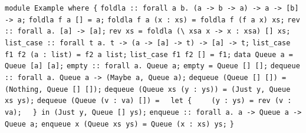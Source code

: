 \begin{isabellebody}
\begin{isamarkuptext}
\verb|module Example where {|\newline%
\newline%
\newline%
\verb|foldla :: forall a b. (a -> b -> a) -> a -> [b] -> a;|\newline%
\verb|foldla f a [] = a;|\newline%
\verb|foldla f a (x : xs) = foldla f (f a x) xs;|\newline%
\newline%
\verb|rev :: forall a. [a] -> [a];|\newline%
\verb|rev xs = foldla (\ xsa x -> x : xsa) [] xs;|\newline%
\newline%
\verb|list_case :: forall t a. t -> (a -> [a] -> t) -> [a] -> t;|\newline%
\verb|list_case f1 f2 (a : list) = f2 a list;|\newline%
\verb|list_case f1 f2 [] = f1;|\newline%
\newline%
\verb|data Queue a = Queue [a] [a];|\newline%
\newline%
\verb|empty :: forall a. Queue a;|\newline%
\verb|empty = Queue [] [];|\newline%
\newline%
\verb|dequeue :: forall a. Queue a -> (Maybe a, Queue a);|\newline%
\verb|dequeue (Queue [] []) = (Nothing, Queue [] []);|\newline%
\verb|dequeue (Queue xs (y : ys)) = (Just y, Queue xs ys);|\newline%
\verb|dequeue (Queue (v : va) []) =|\newline%
\verb|  let {|\newline%
\verb|    (y : ys) = rev (v : va);|\newline%
\verb|  } in (Just y, Queue [] ys);|\newline%
\newline%
\verb|enqueue :: forall a. a -> Queue a -> Queue a;|\newline%
\verb|enqueue x (Queue xs ys) = Queue (x : xs) ys;|\newline%
\newline%
\verb|}|%
\end{isamarkuptext}%
\isamarkuptrue%
%
\endisatagquote
{\isafoldquote}%
%
\isadelimquote
%
\endisadelimquote
%
\begin{isamarkuptext}%

\end{isamarkuptext}
\end{isabellebody}
